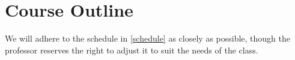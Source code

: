 \documentclass[titlepage]{article}
\begin{document}

\section{Course Outline}
\label{outline}

We will adhere to the schedule in \autoref{schedule} as closely as
possible, though the professor reserves the right to adjust it to suit
the needs of the class.
\end{document}
